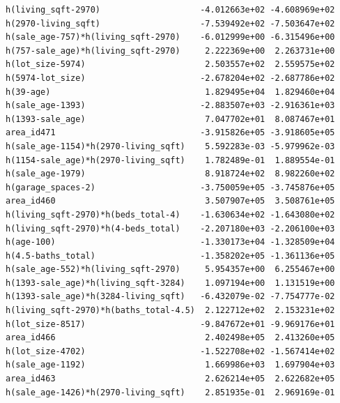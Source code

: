 \documentclass[
]{article}
\begin{document}
\begin{verbatim}
h(living_sqft-2970)                    -4.012663e+02 -4.608969e+02
h(2970-living_sqft)                    -7.539492e+02 -7.503647e+02
h(sale_age-757)*h(living_sqft-2970)    -6.012999e+00 -6.315496e+00
h(757-sale_age)*h(living_sqft-2970)     2.222369e+00  2.263731e+00
h(lot_size-5974)                        2.503557e+02  2.559575e+02
h(5974-lot_size)                       -2.678204e+02 -2.687786e+02
h(39-age)                               1.829495e+04  1.829460e+04
h(sale_age-1393)                       -2.883507e+03 -2.916361e+03
h(1393-sale_age)                        7.047702e+01  8.087467e+01
area_id471                             -3.915826e+05 -3.918605e+05
h(sale_age-1154)*h(2970-living_sqft)    5.592283e-03 -5.979962e-03
h(1154-sale_age)*h(2970-living_sqft)    1.782489e-01  1.889554e-01
h(sale_age-1979)                        8.918724e+02  8.982260e+02
h(garage_spaces-2)                     -3.750059e+05 -3.745876e+05
area_id460                              3.507907e+05  3.508761e+05
h(living_sqft-2970)*h(beds_total-4)    -1.630634e+02 -1.643080e+02
h(living_sqft-2970)*h(4-beds_total)    -2.207180e+03 -2.206100e+03
h(age-100)                             -1.330173e+04 -1.328509e+04
h(4.5-baths_total)                     -1.358202e+05 -1.361136e+05
h(sale_age-552)*h(living_sqft-2970)     5.954357e+00  6.255467e+00
h(1393-sale_age)*h(living_sqft-3284)    1.097194e+00  1.131519e+00
h(1393-sale_age)*h(3284-living_sqft)   -6.432079e-02 -7.754777e-02
h(living_sqft-2970)*h(baths_total-4.5)  2.122712e+02  2.153231e+02
h(lot_size-8517)                       -9.847672e+01 -9.969176e+01
area_id466                              2.402498e+05  2.413260e+05
h(lot_size-4702)                       -1.522708e+02 -1.567414e+02
h(sale_age-1192)                        1.669986e+03  1.697904e+03
area_id463                              2.626214e+05  2.622682e+05
h(sale_age-1426)*h(2970-living_sqft)    2.851935e-01  2.969169e-01
                                                                  

\end{verbatim}
\end{document}
